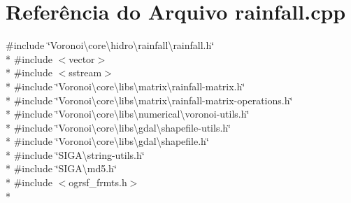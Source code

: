 \section{Referência do Arquivo rainfall.\+cpp}
\label{rainfall_8cpp}
{\ttfamily \#include \char`\"{}Voronoi\textbackslash{}core\textbackslash{}hidro\textbackslash{}rainfall\textbackslash{}rainfall.\+h\char`\"{}}\\*
{\ttfamily \#include $<$vector$>$}\\*
{\ttfamily \#include $<$sstream$>$}\\*
{\ttfamily \#include \char`\"{}Voronoi\textbackslash{}core\textbackslash{}libs\textbackslash{}matrix\textbackslash{}rainfall-\/matrix.\+h\char`\"{}}\\*
{\ttfamily \#include \char`\"{}Voronoi\textbackslash{}core\textbackslash{}libs\textbackslash{}matrix\textbackslash{}rainfall-\/matrix-\/operations.\+h\char`\"{}}\\*
{\ttfamily \#include \char`\"{}Voronoi\textbackslash{}core\textbackslash{}libs\textbackslash{}numerical\textbackslash{}voronoi-\/utils.\+h\char`\"{}}\\*
{\ttfamily \#include \char`\"{}Voronoi\textbackslash{}core\textbackslash{}libs\textbackslash{}gdal\textbackslash{}shapefile-\/utils.\+h\char`\"{}}\\*
{\ttfamily \#include \char`\"{}Voronoi\textbackslash{}core\textbackslash{}libs\textbackslash{}gdal\textbackslash{}shapefile.\+h\char`\"{}}\\*
{\ttfamily \#include \char`\"{}S\+I\+G\+A\textbackslash{}string-\/utils.\+h\char`\"{}}\\*
{\ttfamily \#include \char`\"{}S\+I\+G\+A\textbackslash{}md5.\+h\char`\"{}}\\*
{\ttfamily \#include $<$ogrsf\+\_\+frmts.\+h$>$}\\*
